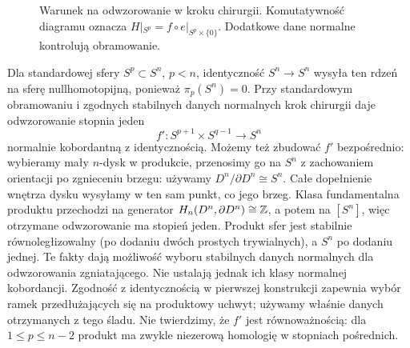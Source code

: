 \begin{figure}[htbp]
\centering
{}
\caption{Warunek na odwzorowanie w kroku chirurgii.
Komutatywność diagramu oznacza
$H|_{S^p}=f\circ e|_{S^p\times\{0\}}$.
Dodatkowe dane normalne kontrolują obramowanie.}
\label{fig:normalna-chirurgia-21}
\end{figure}

\begin{przyklad}
\label{prz:normalna-sfera-21}
Dla standardowej sfery $S^p\subset S^n$, $p<n$,
identyczność $S^n\to S^n$ wysyła ten rdzeń
na sferę nullhomotopijną, ponieważ
$\pi_p(S^n)=0$. Przy standardowym obramowaniu
i zgodnych stabilnych danych normalnych
krok chirurgii daje odwzorowanie stopnia jeden
\[
 f':S^{p+1}\times S^{q-1}\longrightarrow S^n
\]
normalnie kobordantną z identycznością.
Możemy też zbudować $f'$ bezpośrednio:
wybieramy mały $n$-dysk w produkcie,
przenosimy go na $S^n$ z zachowaniem
orientacji po zgnieceniu brzegu: używamy
$D^n/\partial D^n\cong S^n$. Całe dopełnienie wnętrza
dysku wysyłamy w ten sam punkt, co jego brzeg.
Klasa fundamentalna produktu przechodzi na generator
$H_n(D^n,\partial D^n)\cong\mathbb{Z}$, a potem na $[S^n]$,
więc otrzymane odwzorowanie ma stopień jeden.
Produkt sfer jest stabilnie równoległizowalny
(po dodaniu dwóch prostych trywialnych),
a $S^n$ po dodaniu jednej. Te fakty dają możliwość wyboru
stabilnych danych normalnych dla odwzorowania zgniatającego.
Nie ustalają jednak ich klasy normalnej kobordancji.
Zgodność z identycznością w pierwszej konstrukcji zapewnia
wybór ramek przedłużających się na produktowy uchwyt;
używamy właśnie danych otrzymanych z tego śladu.
Nie twierdzimy, że $f'$ jest równoważnością:
dla $1\leq p\leq n-2$ produkt ma zwykle
niezerową homologię w stopniach pośrednich.
\end{przyklad}

